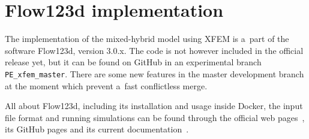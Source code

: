 

\section{Flow123d implementation}

The implementation of the mixed-hybrid model using XFEM is a~part of the software Flow123d, version 3.0.x.
The code is not however included in the official release yet, but it can be found on GitHub in an experimental branch \verb'PE_xfem_master'.
There are some new features in the master development branch at the moment which prevent a~fast conflictless merge.

All about Flow123d, including its installation and usage inside Docker, the input file format and running simulations
can be found through the official web pages~\cite{flow123d}, its GitHub pages and its current documentation~\cite{flow123d_doc_2018}.

